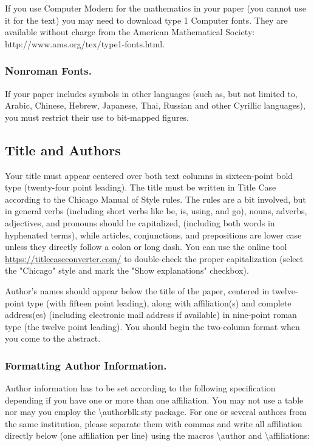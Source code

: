 If you use Computer Modern for the mathematics in your paper (you cannot use it for the text) you may need to download type 1 Computer fonts. They are available without charge from the American Mathematical Society:
http://www.ams.org/tex/type1-fonts.html.

\subsubsection{Nonroman Fonts.}
If your paper includes symbols in other languages (such as, but not limited to, Arabic, Chinese, Hebrew, Japanese, Thai, Russian and other Cyrillic languages), you must restrict their use to bit-mapped figures.

\subsection{Title and Authors}
Your title must appear centered over both text columns in sixteen-point bold type (twenty-four point leading). The title must be written in Title Case according to the Chicago Manual of Style rules. The rules are a bit involved, but in general verbs (including short verbs like be, is, using, and go), nouns, adverbs, adjectives, and pronouns should be capitalized, (including both words in hyphenated terms), while articles, conjunctions, and prepositions are lower case unless they directly follow a colon or long dash. You can use the online tool \url{https://titlecaseconverter.com/} to double-check the proper capitalization (select the "Chicago" style and mark the "Show explanations" checkbox).

Author's names should appear below the title of the paper, centered in twelve-point type (with fifteen point leading), along with affiliation(s) and complete address(es) (including electronic mail address if available) in nine-point roman type (the twelve point leading). You should begin the two-column format when you come to the abstract.

\subsubsection{Formatting Author Information.}
Author information has to be set according to the following specification depending if you have one or more than one affiliation. You may not use a table nor may you employ the \textbackslash authorblk.sty package. For one or several authors from the same institution, please separate them with commas and write all affiliation directly below (one affiliation per line) using the macros \textbackslash author and \textbackslash affiliations:

